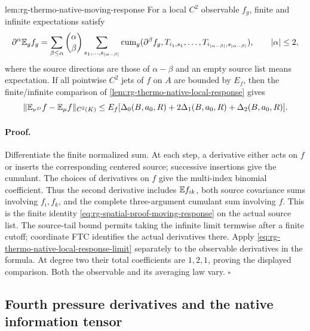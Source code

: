 {lem:rg-thermo-native-moving-response}
For a local \(C^2\) observable \(f_g\), finite and infinite expectations
satisfy
\begin{equation}
 \partial^\alpha\mathbb E_g f_g=
 \sum_{\beta\le\alpha}{\alpha\choose\beta}
 \sum_{s_1,\ldots,s_{|\alpha-\beta|}}
 \operatorname{cum}_g(\partial^\beta f_g,T_{i_1,s_1},\ldots,
                                  T_{i_{|\alpha-\beta|},s_{|\alpha-\beta|}}),
 \qquad |\alpha|\le2,
 \label{eq:rg-thermo-native-moving-response}
\end{equation}
where the source directions are those of \(\alpha-\beta\) and an empty
source list means expectation. If all pointwise \(C^2\) jets of \(f\)
on \(A\) are bounded by \(E_f\), then the finite/infinite comparison
of \cref{lem:rg-thermo-native-local-response} gives
\begin{equation}
 \|\mathbb E_{\nu^D}f-\mathbb E_\mu f\|_{C^2(K)}
 \le E_f[\Delta_0(B,a_0,R)+2\Delta_1(B,a_0,R)+\Delta_2(B,a_0,R)].
 \label{eq:rg-thermo-native-moving-comparison}
\end{equation}\thermoestablishedstatus


\paragraph{Proof.}
Differentiate the finite normalized sum. At each step, a derivative either
acts on \(f\) or inserts the corresponding centered source; successive
insertions give the cumulant. The choices of derivatives on \(f\) give
the multi-index binomial coefficient. Thus the second derivative includes
\(\mathbb E f_{ik}\), both source covariance sums involving \(f_i,f_k\),
and the complete three-argument cumulant sum involving \(f\).
This is the finite identity
\cref{eq:rg-spatial-proof-moving-response} on the actual source list.
The source-tail bound permits taking the infinite limit termwise after a
finite cutoff; coordinate FTC identifies the actual derivatives there.
Apply \cref{eq:rg-thermo-native-local-response-limit} separately to the
observable derivatives in the formula. At degree two their total
coefficients are \(1,2,1\), proving the displayed comparison. Both the
observable and its averaging law vary. \hfill\(\square\)

\subsection{Fourth pressure derivatives and the native information tensor}
\label{sec:rg-thermo-native-pressure}

